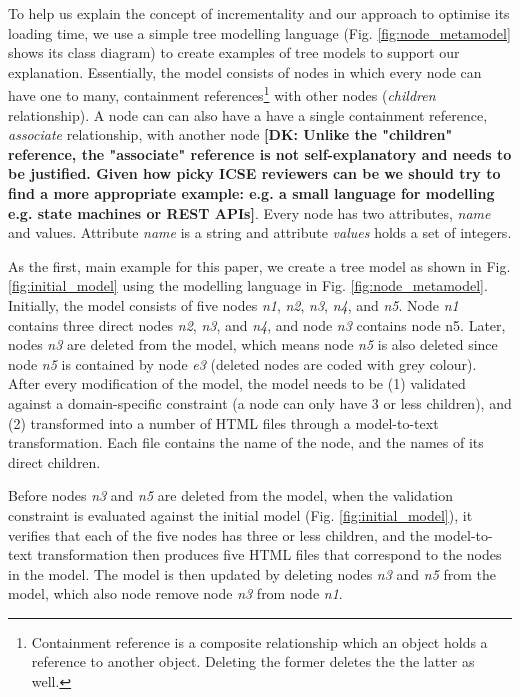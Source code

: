 \documentclass[sigconf]{acmart}
\newcommand{\dk}[1]{\textbf{[DK: #1]}}
\begin{document}
To help us explain the concept of incrementality and our approach to optimise its loading time, we use a simple tree modelling language (Fig. \ref{fig:node_metamodel} shows its class diagram) to create examples of  tree models to support our explanation. Essentially, the model consists of nodes in which every node can have one to many, containment references\footnote{Containment reference is a composite relationship which an object holds a reference to another object. Deleting the former deletes the the latter as well.} with other nodes (\emph{children} relationship). A node can can also have a have a single containment reference, \emph{associate} relationship, with another node \dk{Unlike the "children" reference, the "associate" reference is not self-explanatory and needs to be justified. Given how picky ICSE reviewers can be we should try to find a more appropriate example: e.g. a small language for modelling e.g. state machines or REST APIs}. Every node has two attributes, \emph{name} and {values}. Attribute \emph{name} is a string and attribute \emph{values} holds a set of integers.

As the first, main example for this paper, we create a tree model as shown in Fig. \ref{fig:initial_model} using the modelling language in Fig. \ref{fig:node_metamodel}. Initially, the model consists of five nodes \emph{n1}, \emph{n2}, \emph{n3}, \emph{n4}, and \emph{n5}. Node \emph{n1} contains three direct nodes \emph{n2}, \emph{n3}, and \emph{n4}, and node \emph{n3} contains node {n5}. Later, nodes \emph{n3} are deleted from the model, which means node \emph{n5} is also deleted since node \emph{n5} is contained by node \emph{e3} (deleted nodes are coded with grey colour). After every modification of the model, the model needs to be (1) validated against a domain-specific constraint (a node can only have 3 or less children), and (2) transformed into a number of HTML files through a model-to-text transformation. Each file contains the name of the node, and the names of its direct children.

Before nodes \emph{n3} and \emph{n5} are deleted from the model, when the validation constraint is evaluated against the initial model (Fig. \ref{fig:initial_model}), it verifies that each of the five nodes has three or less children, and the model-to-text transformation then produces five HTML files that correspond to the nodes in the model. The model is then updated by deleting nodes \emph{n3} and \emph{n5} from the model, which also node remove node \emph{n3} from node \emph{n1}. 
\end{document}
